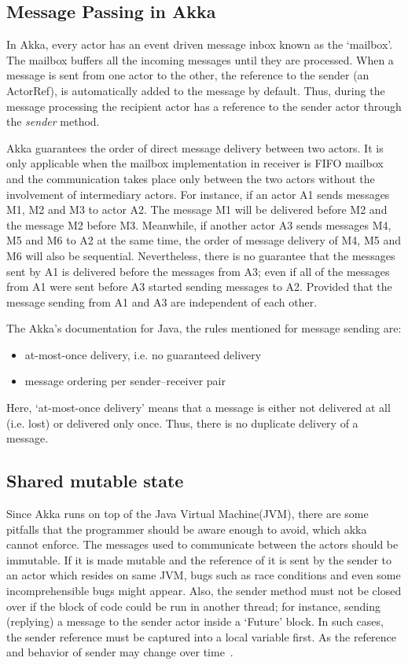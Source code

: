   \subsection{Message Passing in Akka}
  \label{subsec:akkaMessagePassing}
  In Akka, every actor has an event driven message inbox known as the ‘mailbox’. The mailbox buffers all the incoming messages until they are processed. When a message is sent from one actor to the other, the reference to the sender (an ActorRef), is automatically added to the message by default. Thus, during the message processing the recipient actor has a reference to the sender actor through the \emph{sender} method.~\cite{akkaJavaDoc}

  Akka guarantees the order of direct message delivery between two actors. It is only applicable when the mailbox implementation in receiver is FIFO mailbox and the communication takes place only between the two actors without the involvement of intermediary actors. For instance, if an actor A1 sends messages M1, M2 and M3 to actor A2. The message M1 will be delivered before M2 and the message M2 before M3. Meanwhile, if another actor A3 sends messages M4, M5 and M6 to A2 at the same time, the order of message delivery of M4, M5 and M6 will also be sequential. Nevertheless, there is no guarantee that the messages sent by A1 is delivered before the messages from A3; even if all of the messages from A1 were sent before A3 started sending messages to A2. Provided that the message sending from A1 and A3 are independent of each other. ~\cite{akkaJavaDoc}

  The Akka's documentation for Java, the rules mentioned for message sending are: \cite{akkaJavaDoc}
  \begin{itemize}
    \item at-most-once delivery, i.e. no guaranteed delivery
    \item message ordering per sender–receiver pair
  \end{itemize}

Here, ‘at-most-once delivery’ means that a message is either not delivered at all (i.e. lost) or delivered only once. Thus, there is no duplicate delivery of a message.

  \subsection{Shared mutable state}
  Since Akka runs on top of the Java Virtual Machine(JVM), there are some pitfalls that the programmer should be aware enough to avoid, which akka cannot enforce. The messages used to communicate between the actors should be immutable. If it is made mutable and the reference of it is sent by the sender to an actor which resides on same JVM, bugs such as race conditions and even some incomprehensible bugs might appear. Also, the sender method must not be closed over if the block of code could be run in another thread; for instance, sending (replying) a message to the sender actor inside a ‘Future’ block. In such cases, the sender reference must be captured into a local variable first. As the reference and behavior of sender may change over time~\cite{akkaJavaDoc}.

